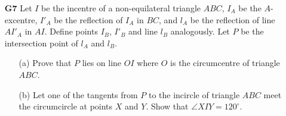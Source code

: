 \documentclass[11pt,a4paper]{article}
\begin{document}
\begin{itemize}
\newpage

\item[\textbf{G7}]
Let $I$ be the incentre of a non-equilateral triangle $ABC$, $I_A$ be the $A$-excentre, $I'_A$ be the reflection of $I_A$ in $BC$, and $l_A$ be the reflection of line $AI'_A$ in $AI$. Define points $I_B$, $I'_B$ and line $l_B$ analogously. Let $P$ be the intersection point of $l_A$ and $l_B$.

\begin{itemize}
\item [(a)] Prove that $P$ lies on line $OI$ where $O$ is the circumcentre of triangle $ABC$.
\item [(b)] Let one of the tangents from $P$ to the incircle of triangle $ABC$ meet the circumcircle at points $X$ and $Y$. Show that $\angle XIY = 120^{\circ}$.
\end{itemize}


\end{itemize}
\end{document}
